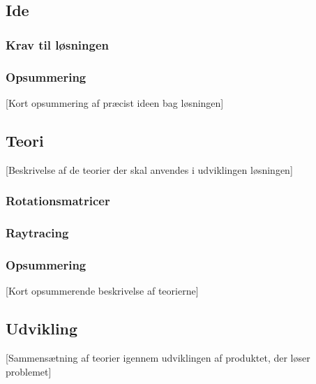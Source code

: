 \subsection{Ide}



\subsubsection{Krav til løsningen}



\subsubsection*{Opsummering}

[Kort opsummering af præcist ideen bag løsningen]

\subsection{Teori}

[Beskrivelse af de teorier der skal anvendes i udviklingen løsningen]

\subsubsection{Rotationsmatricer}



\subsubsection{Raytracing}



\subsubsection*{Opsummering}

[Kort opsummerende beskrivelse af teorierne]

\subsection{Udvikling}

[Sammensætning af teorier igennem udviklingen af produktet, der løser problemet]

\clearpage